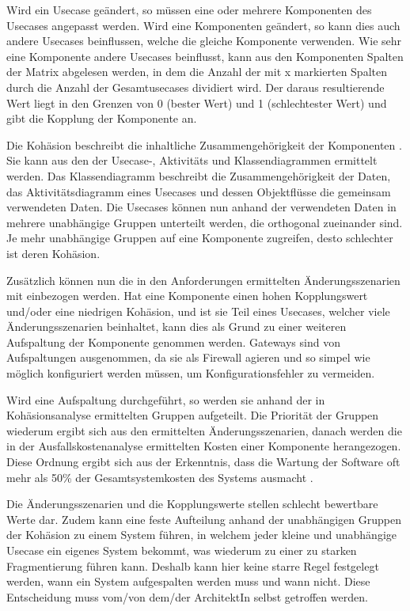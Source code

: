 Wird ein Usecase geändert, so müssen eine oder mehrere Komponenten des Usecases angepasst werden. Wird eine Komponenten geändert, so kann dies auch andere Usecases beinflussen, welche die gleiche Komponente verwenden. Wie sehr eine Komponente andere Usecases beinflusst, kann aus den Komponenten Spalten der Matrix abgelesen werden, in dem die Anzahl der mit x markierten Spalten durch die Anzahl der Gesamtusecases dividiert wird. Der daraus resultierende Wert liegt in den Grenzen von 0 (bester Wert) und 1 (schlechtester Wert) und gibt die Kopplung der Komponente an. \cite[S. 164]{effektiv}

Die Kohäsion beschreibt die inhaltliche Zusammengehörigkeit der Komponenten \cite[S. 164]{effektiv}. Sie kann aus den der Usecase-, Aktivitäts und Klassendiagrammen ermittelt werden. Das Klassendiagramm beschreibt die Zusammengehörigkeit der Daten, das Aktivitätsdiagramm eines Usecases und dessen Objektflüsse die gemeinsam verwendeten Daten. Die Usecases können nun anhand der verwendeten Daten in mehrere unabhängige Gruppen unterteilt werden, die orthogonal zueinander sind. Je mehr unabhängige Gruppen auf eine Komponente zugreifen, desto schlechter ist deren Kohäsion.

Zusätzlich können nun die in den Anforderungen ermittelten Änderungsszenarien mit einbezogen werden. Hat eine Komponente einen hohen Kopplungswert und/oder eine niedrigen Kohäsion, und ist sie Teil eines Usecases, welcher viele Änderungsszenarien beinhaltet, kann dies als Grund zu einer weiteren Aufspaltung der Komponente genommen werden. Gateways sind von Aufspaltungen ausgenommen, da sie als Firewall agieren und so simpel wie möglich konfiguriert werden müssen, um Konfigurationsfehler zu vermeiden.

Wird eine Aufspaltung durchgeführt, so werden sie anhand der in Kohäsionsanalyse ermittelten Gruppen aufgeteilt. Die Priorität der Gruppen wiederum ergibt sich aus den ermittelten Änderungsszenarien, danach werden die in der Ausfallskostenanalyse ermittelten Kosten einer Komponente herangezogen. Diese Ordnung ergibt sich aus der Erkenntnis, dass die Wartung der Software oft mehr als 50\% der Gesamtsystemkosten des Systems ausmacht \cite[S. 71-84]{maincost}.

Die Änderungsszenarien und die Kopplungswerte stellen schlecht bewertbare Werte dar. Zudem kann eine feste Aufteilung anhand der unabhängigen Gruppen der Kohäsion zu einem System führen, in welchem jeder kleine und unabhängige Usecase ein eigenes System bekommt, was wiederum zu einer zu starken Fragmentierung führen kann. Deshalb kann hier keine starre Regel festgelegt werden, wann ein System aufgespalten werden muss und wann nicht. Diese Entscheidung muss vom/von dem/der ArchitektIn selbst getroffen werden.

